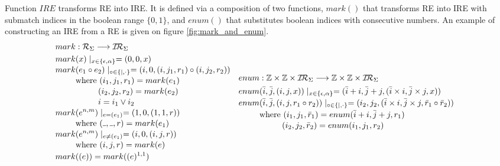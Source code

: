 \documentclass[AMA,STIX1COL]{WileyNJD-v2}
\newcommand{\Xund}{\rule{.4em}{.4pt}}
\newcommand{\XI}{\mathcal{I}}
\newcommand{\XIR}{\XI\!\XR}
\newcommand{\XR}{\mathcal{R}}
\newcommand{\YZ}{\mathbb{Z}}
\newcommand{\IRE}{I\!RE}
\begin{document}
Function $\IRE$ transforms RE into IRE.
It is defined via a composition of two functions,
$mark()$ that transforms RE into IRE with submatch indices in the boolean range $\{0, 1\}$,
and $enum()$ that substitutes boolean indices with consecutive numbers.
An example of constructing an IRE from a RE is given on figure \ref{fig:mark_and_enum}.
%
    \begin{align*}
    &\begin{aligned}
        mark &: \XR_\Sigma \longrightarrow \XIR_\Sigma \\
        mark &(x) \mid_{x \in \{\epsilon, \alpha\}} = (0, 0, x) \\[-0.2em]
        mark &(e_1 \circ e_2) \mid_{\circ \in \{|,\cdot\}} = (i, 0,
            (i, j_1, r_1) \circ
            (i, j_2, r_2)
            ) \\[-0.2em]
            &\text{where }            (i_1, j_1, r_1) = mark(e_1) \\[-0.2em]
            &\space{\hphantom{where }}(i_2, j_2, r_2) = mark(e_2) \\[-0.2em]
            &\space{\hphantom{where }}i = i_1 \vee i_2 \\[-0.2em]
        mark &(e^{n, m}) \mid_{e = (e_1)} = (1, 0, (1, 1, r)) \\[-0.2em]
            &\text{where } (\Xund, \Xund, r) = mark(e_1) \\[-0.2em]
        mark &(e^{n, m}) \mid_{e \neq (e_1)} = (i, 0, (i, j, r)) \\[-0.2em]
            &\text{where } (i, j, r) = mark(e) \\[-0.2em]
        mark &((e)) = mark((e)^{1, 1})
    \end{aligned}
    &&\begin{aligned}
        enum &: \YZ \times \YZ \times \XIR_\Sigma \longrightarrow \YZ \times \YZ \times \XIR_\Sigma \\
        enum &(\bar{i}, \bar{j}, (i, j, x)) \mid_{x \in \{\epsilon, \alpha\}}
            = (\bar{i} + i, \bar{j} + j, (\bar{i} \times i, \bar{j} \times j, x))
        \\[-0.2em]
        enum &(\bar{i}, \bar{j}, (i, j, r_1 \circ r_2)) \mid_{\circ \in \{|,\cdot\}}
            = (i_2, j_2, (\bar{i} \times i, \bar{j} \times j, \bar{r}_1 \circ \bar{r}_2)) \\[-0.2em]
            &\text{where }            (i_1, j_1, \bar{r}_1) = enum(\bar{i} + i, \bar{j} + j, r_1) \\[-0.2em]
            &\space{\hphantom{where }}(i_2, j_2, \bar{r}_2) = enum(i_1, j_1, r_2)

\end{aligned}
\end{align*}
\end{document}
